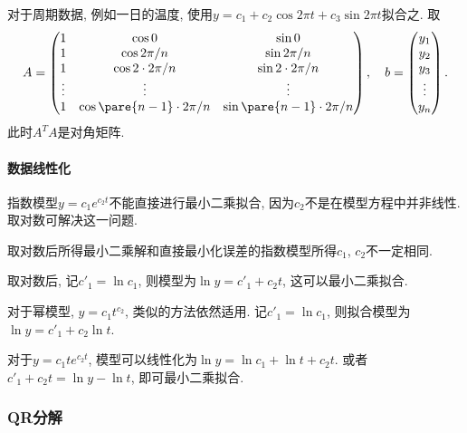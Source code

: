 \documentclass[20pt]{extarticle}
\begin{document}
对于周期数据, 例如一日的温度, 使用$y = c_1 + c_2\cos 2\pi t + c_3\sin 2\pi t$拟合之. 取
\[ A = \begin{pmatrix}
    1 & \cos 0 & \sin 0 \\
    1 & \cos 2\pi/n & \sin 2\pi/n \\
    1 & \cos 2\cdot 2\pi/n & \sin 2\cdot 2\pi/n \\
    \vdots & \vdots & \vdots \\
    1 & \cos \pare{n-1}\cdot 2\pi/n & \sin \pare{n-1}\cdot 2\pi/n
\end{pmatrix},\quad b = \begin{pmatrix}
    y_1 \\ y_2 \\ y_3 \\ \vdots \\ y_n
\end{pmatrix}. \]
此时$A^TA$是对角矩阵.


\paragraph{数据线性化} %
\label{par:数据线性化}

指数模型$y=c_1e^{c_2t}$不能直接进行最小二乘拟合, 因为$c_2$不是在模型方程中并非线性. 取对数可解决这一问题.
\begin{remark}
    取对数后所得最小二乘解和直接最小化误差的指数模型所得$c_1$, $c_2$不一定相同.
\end{remark}
取对数后, 记$c'_1 = \ln c_1$, 则模型为$\ln y = c'_1 + c_2t$, 这可以最小二乘拟合.
\par
对于幂模型, $y = c_1t^{c_2}$, 类似的方法依然适用. 记$c'_1 = \ln c_1$, 则拟合模型为$\ln y = c'_1 + c_2\ln t$.
\par
对于$y=c_1te^{c_2 t}$, 模型可以线性化为$\ln y = \ln c_1 + \ln t + c_2 t$. 或者$c'_1 + c_2 t = \ln y - \ln t$, 即可最小二乘拟合.



\subsubsection{QR分解} %
\label{ssub:qr分解}
\end{document}
